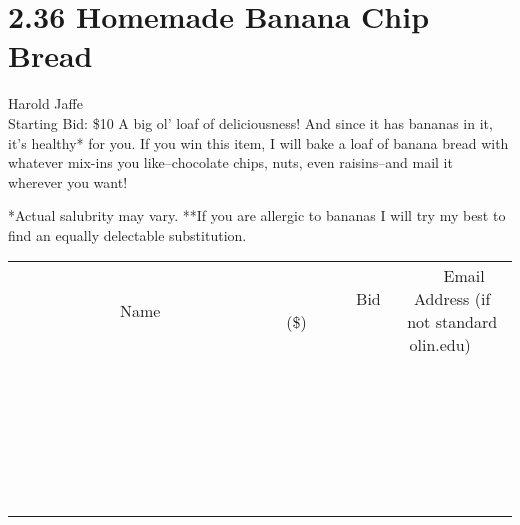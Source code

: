 \documentclass[11pt]{article}
\begin{document}
\section*{2.36 Homemade Banana Chip Bread}
Harold Jaffe
\\
Starting Bid: \$10
\newline
A big ol' loaf of deliciousness! And since it has bananas in it, it's healthy* for you. If you win this item, I will bake a loaf of banana bread with whatever mix-ins you like--chocolate chips, nuts, even raisins--and mail it wherever you want!

*Actual salubrity may vary.
**If you are allergic to bananas I will try my best to find an equally delectable substitution.
\\[6ex]
\begin{tabular}{c c c}
~~~~~~~~~~~~~Name~~~~~~~~~~~~~ & ~~~~~~~~~Bid (\$)~~~~~~~~~  & ~~~Email Address (if not standard olin.edu)~~~\\
 & & \\
\hline
 & & \\
\hline
 & & \\
\hline
 & & \\
\hline
 & & \\
\hline
 & & \\
\hline
 & & \\
\hline
 & & \\
\hline
 & & \\
\hline
 & & \\
\hline
 & & \\
\hline
 & & \\
\hline
 & & \\
\hline
 & & \\
\hline
 & & \\
\hline
 & & \\
\hline
 & & \\
\hline
 & & \\
\hline
 & & \\
\hline
 & & \\
\hline
 & & \\
\hline
 & & \\
\hline
 & & \\
\hline
 & & \\
\hline
 & & \\
\hline
 & & \\
\hline
\end{tabular}
\newpage
\end{document}
